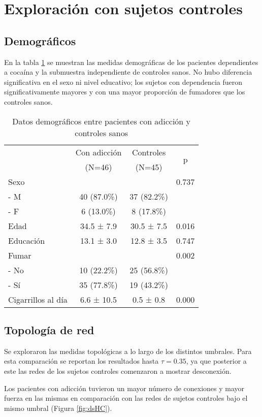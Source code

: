 \section{Exploración con sujetos controles}
\subsection{Demográficos}

En la tabla \ref{tab:demHC} se muestran las medidas demográficas de los pacientes dependientes a cocaína y la submuestra independiente de controles sanos.
No hubo diferencia significativa en el sexo ni nivel educativo; los sujetos con dependencia fueron significativamente mayores y con una mayor proporción de fumadores que los controles sanos.

\begin{table}[hbp]
    \centering
    \small
    \caption{Datos demográficos entre pacientes con adicción y controles sanos}
    \label{tab:demHC}
    \begin{tabular}{lccc}
        \hline
        & Con adicción & Controles & \multirow{2}{*}{p}\\
        & (N=46) & (N=45) & \\
        \hline
        Sexo            &  &  & 0.737\\
        - M           & 40 (87.0\%) & 37 (82.2\%) & \\
        - F           & 6 (13.0\%) & 8 (17.8\%) & \\
        Edad            & 34.5 ±  7.9 & 30.5 ±  7.5 & 0.016\\
        Educación       & 13.1 ±  3.0 & 12.8 ±  3.5 & 0.747\\
        Fumar           &  &  & 0.002\\
        - No          & 10 (22.2\%) & 25 (56.8\%) & \\
        - Sí          & 35 (77.8\%) & 19 (43.2\%) & \\
        Cigarrillos al día &  6.6 ± 10.5 &  0.5 ±  0.8 & 0.000\\
        \hline
    \end{tabular}
\end{table}

\subsection{Topología de red}
Se exploraron las medidas topológicas a lo largo de los distintos umbrales.
Para esta comparación se reportan los resultados hasta $\tau = 0.35$, ya que posterior a este las redes de los sujetos controles comenzaron a mostrar desconexión.\par
Los pacientes con adicción tuvieron un mayor número de conexiones y mayor fuerza en las mismas en comparación con las redes de sujetos controles
bajo el mismo umbral (Figura \ref{fig:dsHC}).

